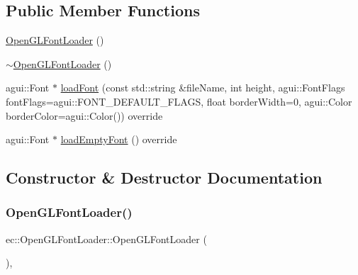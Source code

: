\subsection*{Public Member Functions}
\begin{DoxyCompactItemize}
\item 
\mbox{\hyperlink{classec_1_1_open_g_l_font_loader_a07f150bbedc07d3f8ab3e3b2705054ea}{Open\+G\+L\+Font\+Loader}} ()
\item 
\mbox{\hyperlink{classec_1_1_open_g_l_font_loader_aa84c416f951c9d9b6d666a3a738dce15}{$\sim$\+Open\+G\+L\+Font\+Loader}} ()
\item 
agui\+::\+Font $\ast$ \mbox{\hyperlink{classec_1_1_open_g_l_font_loader_ae5b0e8420e508ec181a551ead035513f}{load\+Font}} (const std\+::string \&file\+Name, int height, agui\+::\+Font\+Flags font\+Flags=agui\+::\+F\+O\+N\+T\+\_\+\+D\+E\+F\+A\+U\+L\+T\+\_\+\+F\+L\+A\+GS, float border\+Width=0, agui\+::\+Color border\+Color=agui\+::\+Color()) override
\item 
agui\+::\+Font $\ast$ \mbox{\hyperlink{classec_1_1_open_g_l_font_loader_acd2b5a35ecf682fecde27cee63813589}{load\+Empty\+Font}} () override
\end{DoxyCompactItemize}


\subsection{Constructor \& Destructor Documentation}
\mbox{\label{classec_1_1_open_g_l_font_loader_a07f150bbedc07d3f8ab3e3b2705054ea}} 
\subsubsection{\texorpdfstring{Open\+G\+L\+Font\+Loader()}{OpenGLFontLoader()}}
{\footnotesize\ttfamily ec\+::\+Open\+G\+L\+Font\+Loader\+::\+Open\+G\+L\+Font\+Loader (\begin{DoxyParamCaption}{ }\end{DoxyParamCaption})\hspace{0.3cm}{\ttfamily [explicit]}, {\ttfamily [default]}}

\mbox{\label{classec_1_1_open_g_l_font_loader_aa84c416f951c9d9b6d666a3a738dce15}} 
